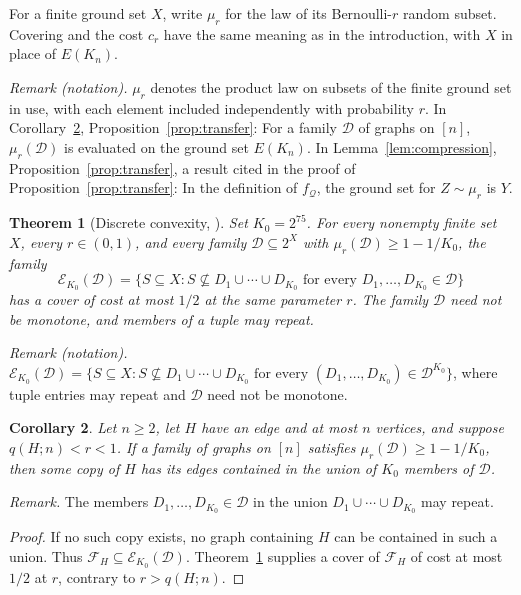 \documentclass[11pt]{article}
\newtheorem{theorem}{Theorem}[section]
\newtheorem{corollary}[theorem]{Corollary}
\theoremstyle{remark}
\numberwithin{equation}{section}
\newcommand{\calD}{\mathcal D}
\newcommand{\calF}{\mathcal F}
\newcommand{\calQ}{\mathcal Q}
\begin{document}
For a finite ground set $X$, write $\mu_r$ for the law of its
Bernoulli-$r$ random subset. Covering and the cost $c_r$ have the
same meaning as in the introduction, with $X$ in place of $E(K_n)$.

\noindent\textit{Remark (notation).} $\mu_r$ denotes the product law on subsets of the finite ground set in use, with each element included independently with probability $r$. In Corollary~\ref{cor:typical-cover}, Proposition~\ref{prop:transfer}: For a family $\calD$ of graphs on $[n]$, $\mu_r(\calD)$ is evaluated on the ground set $E(K_n)$. In Lemma~\ref{lem:compression}, Proposition~\ref{prop:transfer}, a result cited in the proof of Proposition~\ref{prop:transfer}: In the definition of $f_{\calQ}$, the ground set for $Z\sim\mu_r$ is $Y$.


\begin{theorem}[Discrete convexity, {\cite[Theorem~1.1]{OpenAI26DC}}]
\label{thm:discrete}
Set $K_0=2^{75}$. For every nonempty finite set $X$, every
$r\in(0,1)$, and every family $\calD\subseteq2^X$ with
$\mu_r(\calD)\geq1-1/K_0$, the family
\[
 \mathcal E_{K_0}(\calD)=
 \{S\subseteq X:S\not\subseteq D_1\cup\cdots\cup D_{K_0}
                   \text{ for every }D_1,\ldots,D_{K_0}\in\calD\}
\]
has a cover of cost at most $1/2$ at the same parameter $r$.
The family $\calD$ need not be monotone, and members of a tuple
may repeat.
\end{theorem}

\noindent\textit{Remark (notation).} $\mathcal E_{K_0}(\calD)=\{S\subseteq X:S\not\subseteq D_1\cup\cdots\cup D_{K_0}\text{ for every }(D_1,\ldots,D_{K_0})\in\calD^{K_0}\}$, where tuple entries may repeat and $\calD$ need not be monotone.


\begin{corollary}\label{cor:typical-cover}
Let $n\geq2$, let $H$ have an edge and at most $n$ vertices,
and suppose $q(H;n)<r<1$. If a family of graphs on $[n]$
satisfies $\mu_r(\calD)\geq1-1/K_0$, then some copy of $H$
has its edges contained in the union of $K_0$ members of $\calD$.
\end{corollary}

\noindent\textit{Remark.} The members $D_1,\ldots,D_{K_0}\in\calD$ in the union $D_1\cup\cdots\cup D_{K_0}$ may repeat.

\begin{proof}
If no such copy exists, no graph containing $H$ can be contained
in such a union. Thus $\calF_H\subseteq\mathcal E_{K_0}(\calD)$.
Theorem~\ref{thm:discrete} supplies a cover of $\calF_H$ of
cost at most $1/2$ at $r$, contrary to $r>q(H;n)$.
\end{proof}
\end{document}
